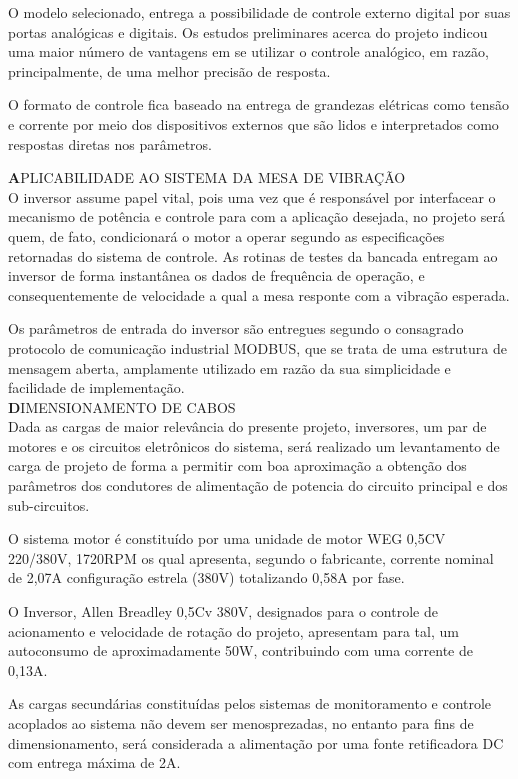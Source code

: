         O modelo selecionado, entrega a possibilidade de controle externo digital por suas portas analógicas e digitais. Os estudos preliminares acerca do projeto indicou uma maior número de vantagens em se utilizar o controle analógico, em razão, principalmente, de uma melhor precisão de resposta.

        O formato de controle fica baseado na entrega de grandezas elétricas como tensão e corrente por meio dos dispositivos externos que são lidos e interpretados como respostas diretas nos parâmetros.


\textbf APLICABILIDADE AO SISTEMA DA MESA DE VIBRAÇÃO\\

O inversor assume papel vital, pois uma vez que é responsável por interfacear o mecanismo de potência e controle para com a aplicação desejada, no projeto será quem, de fato, condicionará o motor a operar segundo as especificações retornadas do sistema de controle. As rotinas de testes da bancada entregam ao inversor de forma instantânea os dados de frequência de operação, e consequentemente de velocidade a qual a mesa responte com a vibração esperada.

Os parâmetros de entrada do inversor são entregues segundo o consagrado protocolo de comunicação industrial MODBUS, que se trata de uma estrutura de mensagem aberta, amplamente utilizado em razão da sua simplicidade e facilidade de implementação.\\

\textbf DIMENSIONAMENTO DE CABOS\\

Dada as cargas de maior relevância do presente projeto, inversores, um par de motores e os circuitos eletrônicos do sistema, será realizado um levantamento de carga de projeto de forma a permitir com boa aproximação a obtenção dos parâmetros dos condutores de alimentação de potencia do circuito principal e dos sub-circuitos.

    O sistema motor é constituído por uma unidade de motor WEG 0,5CV 220/380V, 1720RPM os qual apresenta, segundo o fabricante, corrente nominal de 2,07A configuração estrela (380V) totalizando 0,58A por fase.

    O Inversor, Allen Breadley 0,5Cv 380V, designados para o controle de acionamento e velocidade de rotação do projeto, apresentam para tal, um autoconsumo de aproximadamente 50W, contribuindo com uma corrente de 0,13A.

    As cargas secundárias constituídas pelos sistemas de monitoramento e controle acoplados ao sistema não devem  ser menosprezadas, no entanto para fins de dimensionamento, será considerada a alimentação por uma fonte retificadora DC com entrega máxima de 2A.

